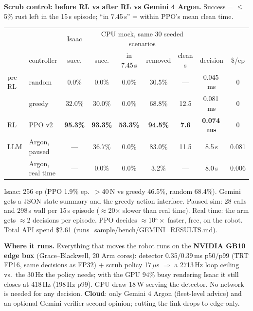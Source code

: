 \documentclass[8pt,a4paper]{extarticle}
\newcommand{\fn}[1]{{\fontsize{5.6}{6.4}\selectfont\ttfamily #1}}
\newcommand{\hd}[1]{\textbf{\textcolor{edge}{#1}}}
\begin{document}
\begin{multicols}{2}
\vspace{3pt}
\hd{Scrub control: before RL vs after RL vs Gemini 4 Argon.} Success = $\leq$5\% rust left in the 15\,s episode;
``in 7.45\,s'' = within PPO's mean clean time.\par\vspace{1pt}
{\scriptsize\setlength{\tabcolsep}{1.6pt}
\noindent\begin{tabular}{@{}llccccccc@{}}
\toprule
& & Isaac & \multicolumn{4}{c}{CPU mock, same 30 seeded scenarios} & & \\
\cmidrule(lr){3-3}\cmidrule(lr){4-7}
& controller & succ. & succ. & in 7.45\,s & removed & clean s & decision & \$/ep \\
\midrule
pre-RL & random        & 0.0\%  & 0.0\%  & 0.0\% & 30.5\% & ---   & 0.045\,ms & 0 \\
          & greedy        & 32.0\% & 30.0\% & 0.0\% & 68.8\% & 12.5 & 0.081\,ms & 0 \\
RL     & PPO v2        & \textbf{95.3\%} & \textbf{93.3\%} & \textbf{53.3\%} & \textbf{94.5\%} & \textbf{7.6} & \textbf{0.074\,ms} & 0 \\
LLM       & Argon, paused & --- & 36.7\% & 0.0\% & 83.0\% & 11.5 & 8.5\,s & 0.081 \\
          & Argon, real time  & --- & 0.0\%  & 0.0\% & 3.2\%  & ---  & 8.0\,s & 0.006 \\
\bottomrule
\end{tabular}}\par
{\scriptsize Isaac: 256 ep (PPO 1.9\% ep.\ $>$40\,N vs greedy 46.5\%, random 68.4\%). Gemini gets a JSON state summary and
the greedy action interface. Paused sim: 28 calls and 298\,s wall per 15\,s episode ($\approx$20$\times$ slower than real
time). Real time: the arm gets $\approx$2 decisions per episode. PPO decides $\approx$10$^5\times$ faster, free, on the
robot. Total API spend \$2.61 (\fn{runs\_sample/bench/GEMINI\_RESULTS.md}).}

\vspace{3pt}
\hd{Where it runs.} Everything that moves the robot runs on the \textbf{NVIDIA GB10 edge box} (Grace--Blackwell, 20
Arm cores): detector 0.35/0.39\,ms p50/p99 (TRT FP16, same decisions as FP32) + scrub policy 17\,$\mu$s $\Rightarrow$
a 2713\,Hz loop ceiling vs.\ the 30\,Hz the policy needs; with the GPU 94\% busy rendering Isaac it still closes at
418\,Hz (198\,Hz p99). GPU draw 18\,W serving the detector. No network is needed for any decision.
\textcolor{cloud}{\textbf{Cloud}}: only Gemini 4 Argon (fleet-level advice) and an optional Gemini verifier second
opinion; cutting the link drops to edge-only.


\end{multicols}
\end{document}
